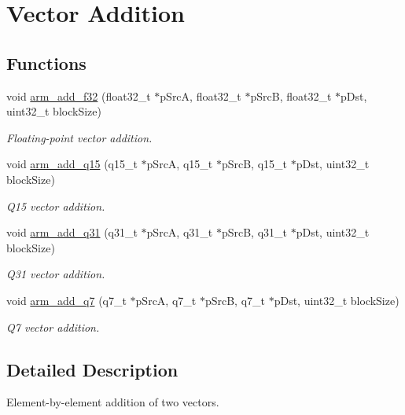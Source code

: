 \hypertarget{group___basic_add}{\section{Vector Addition}
\label{group___basic_add}
}
\subsection*{Functions}
\begin{DoxyCompactItemize}
\item 
void \hyperlink{group___basic_add_ga6a904a547413b10565dd1d251c6bafbd}{arm\-\_\-add\-\_\-f32} (float32\-\_\-t $\ast$p\-Src\-A, float32\-\_\-t $\ast$p\-Src\-B, float32\-\_\-t $\ast$p\-Dst, uint32\-\_\-t block\-Size)
\begin{DoxyCompactList}\small\item\em Floating-\/point vector addition. \end{DoxyCompactList}\item 
void \hyperlink{group___basic_add_gabb51285a41f511670bbff62fc0e1bf62}{arm\-\_\-add\-\_\-q15} (q15\-\_\-t $\ast$p\-Src\-A, q15\-\_\-t $\ast$p\-Src\-B, q15\-\_\-t $\ast$p\-Dst, uint32\-\_\-t block\-Size)
\begin{DoxyCompactList}\small\item\em Q15 vector addition. \end{DoxyCompactList}\item 
void \hyperlink{group___basic_add_ga24d6c3f7f8b9fae4847c0c3f26a39a3b}{arm\-\_\-add\-\_\-q31} (q31\-\_\-t $\ast$p\-Src\-A, q31\-\_\-t $\ast$p\-Src\-B, q31\-\_\-t $\ast$p\-Dst, uint32\-\_\-t block\-Size)
\begin{DoxyCompactList}\small\item\em Q31 vector addition. \end{DoxyCompactList}\item 
void \hyperlink{group___basic_add_gaed633f415a7840a66861debca2dfb96b}{arm\-\_\-add\-\_\-q7} (q7\-\_\-t $\ast$p\-Src\-A, q7\-\_\-t $\ast$p\-Src\-B, q7\-\_\-t $\ast$p\-Dst, uint32\-\_\-t block\-Size)
\begin{DoxyCompactList}\small\item\em Q7 vector addition. \end{DoxyCompactList}\end{DoxyCompactItemize}


\subsection{Detailed Description}
Element-\/by-\/element addition of two vectors.


